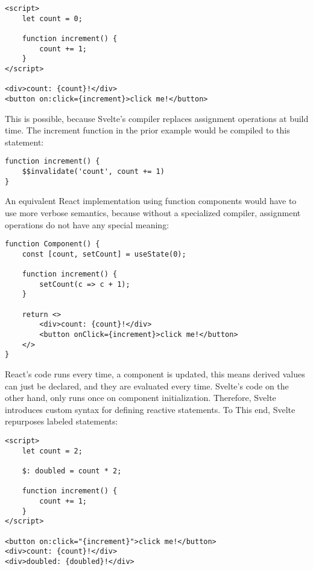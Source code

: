 \begin{verbatim}
<script>
    let count = 0;

    function increment() {
        count += 1;
    }
</script>

<div>count: {count}!</div>
<button on:click={increment}>click me!</button>
\end{verbatim}

This is possible, because Svelte's compiler replaces assignment operations at build time. The increment function in the prior example would be compiled to this statement:

\begin{verbatim}
function increment() {
    $$invalidate('count', count += 1)
}
\end{verbatim}

An equivalent React implementation using function components would have to use more verbose semantics, because without a specialized compiler, assignment operations do not have any special meaning:

\begin{verbatim}
function Component() {
    const [count, setCount] = useState(0);

    function increment() {
        setCount(c => c + 1);
    }

    return <>
        <div>count: {count}!</div>
        <button onClick={increment}>click me!</button>
    </>
}
\end{verbatim}

React's code runs every time, a component is updated, this means derived values can just be declared, and they are evaluated every time. Svelte's code on the other hand, only runs once on component initialization. Therefore, Svelte introduces custom syntax for defining reactive statements. To This end, Svelte repurposes labeled statements:


\begin{verbatim}
<script>
    let count = 2;

    $: doubled = count * 2;

    function increment() {
        count += 1;
    }
</script>

<button on:click="{increment}">click me!</button>
<div>count: {count}!</div>
<div>doubled: {doubled}!</div>
\end{verbatim}


